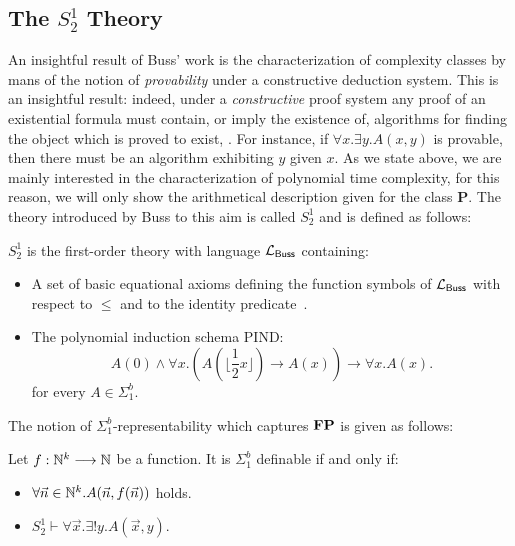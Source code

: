 \subsection{The $S^1_2$ Theory}

An insightful result of Buss' work is the characterization
of complexity classes by mans of the notion of \emph{provability} under a constructive
deduction system. This is an insightful result: indeed, under a \emph{constructive} proof system
any proof of an existential formula must contain, or
imply the existence of, algorithms for finding the object which is proved to exist, \cite{Buss98}.
For instance, if $\forall x. \exists y.A(x, y)$ is provable, then there must be an algorithm exhibiting
$y$ given $x$. As we state above, we are mainly interested in the characterization of polynomial time complexity, for this reason, we will only show the arithmetical description
given for the class $\mathbf P$. The theory introduced
by Buss to this aim is called $S^1_2$ and is defined as follows:

\begin{defn}[$S^1_2$ Theory]
  $S^1_2$ is the first-order theory with language $\mathcal{L}_{\mathsf{Buss}}$ containing:
  \begin{itemize}
    \item A set of basic equational axioms defining the function symbols of $\mathcal{L}_{\mathsf{Buss}}$
    with respect to $\le$ and to the identity predicate~\cite{Buss86}.
    \item The polynomial induction schema PIND:
    $$
    A(0) \land \forall x.(A(\lfloor\frac 1 2 x\rfloor) \to A(x)) \to \forall x. A(x).
    $$
    for every $A \in \Sigma^b_1$.
  \end{itemize}
\end{defn}

\noindent
The notion of $\Sigma^b_1$-representability which captures $\mathbf{FP}$
is given as follows:

\begin{defn}
  Let $f: \mathbb{N}^k \longrightarrow \mathbb{N}$ be a function. It is $\Sigma^b_1$ definable if and only if:
  \begin{itemize}
    \item $\forall \vec n \in \mathbb{N}^k. A(\vec n, f(\vec n))$ holds.
    \item $S^1_2 \vdash \forall \vec x. \exists !y. A(\vec x, y)$.
  \end{itemize}
\end{defn}

